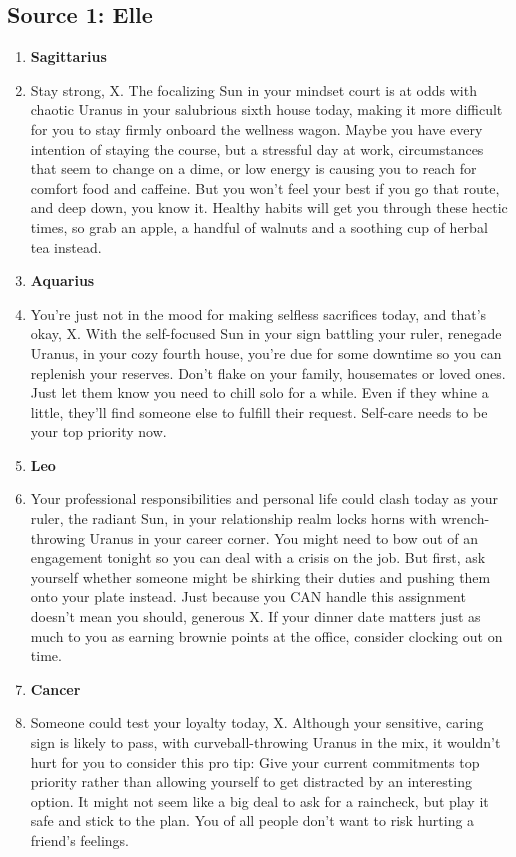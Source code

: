 \documentclass{article}[twocolumn]
\date{\today}
\newcommand{\bb}[1]{\item[] \textbf{#1}}
\begin{document}
\begin{multicols}{2}
\section{Source 1: Elle
}
\begin{enumerate}
     \bb{Sagittarius}
    \item Stay strong, X. The focalizing Sun in your mindset court is at odds with chaotic Uranus in your salubrious sixth house today, making it more difficult for you to stay firmly onboard the wellness wagon. Maybe you have every intention of staying the course, but a stressful day at work, circumstances that seem to change on a dime, or low energy is causing you to reach for comfort food and caffeine. But you won’t feel your best if you go that route, and deep down, you know it. Healthy habits will get you through these hectic times, so grab an apple, a handful of walnuts and a soothing cup of herbal tea instead.\\
     \bb{Aquarius}\
    \item You’re just not in the mood for making selfless sacrifices today, and that’s okay, X. With the self-focused Sun in your sign battling your ruler, renegade Uranus, in your cozy fourth house, you’re due for some downtime so you can replenish your reserves. Don’t flake on your family, housemates or loved ones. Just let them know you need to chill solo for a while. Even if they whine a little, they’ll find someone else to fulfill their request. Self-care needs to be your top priority now.
     \bb{Leo}
    \item Your professional responsibilities and personal life could clash today as your ruler, the radiant Sun, in your relationship realm locks horns with wrench-throwing Uranus in your career corner. You might need to bow out of an engagement tonight so you can deal with a crisis on the job. But first, ask yourself whether someone might be shirking their duties and pushing them onto your plate instead. Just because you CAN handle this assignment doesn’t mean you should, generous X. If your dinner date matters just as much to you as earning brownie points at the office, consider clocking out on time.
     \bb{Cancer}
    \item Someone could test your loyalty today, X. Although your sensitive, caring sign is likely to pass, with curveball-throwing Uranus in the mix, it wouldn’t hurt for you to consider this pro tip: Give your current commitments top priority rather than allowing yourself to get distracted by an interesting option. It might not seem like a big deal to ask for a raincheck, but play it safe and stick to the plan. You of all people don’t want to risk hurting a friend’s feelings.

\end{enumerate}
\end{multicols}
\end{document}
